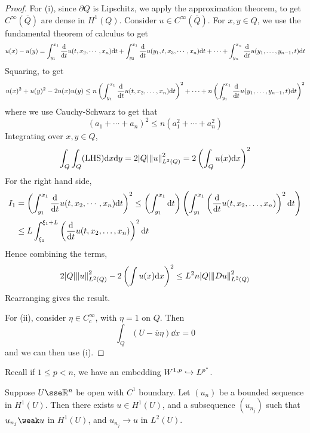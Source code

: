 \documentclass{article}
\begin{document}
\begin{proof}
    For (i), since \(\partial Q\) is Lipschitz, we apply the approximation theorem, to get \(C^\infty(\overline Q)\) are dense in \(H^1(Q)\). Consider \(u \in C^\infty(\overline Q)\). For \(x, y \in Q\), we use the fundamental theorem of calculus to get
    \begin{align*}
        u(x) - u(y) = \int_{y_1}^{x_1}\dv{t}u(t, x_2, \cdots, x_n)\dd t + \int_{y_2}^{x_1}\dv{t}u(y_1, t, x_3, \cdots, x_n)\dd t + \cdots + \int_{y_n}^{x_n}\dv{t}u(y_1, \dots, y_{n-1}, t)\dd t
    \end{align*}
    Squaring, to get
    \begin{align*}
        u(x)^2 + u(y)^2 - 2u(x)u(y) \le n\left(\int_{y_1}^{x_1}\dv{t}u(t, x_2, \dots, x_n)\dd t\right)^2 + \cdots + n\left(\int_{y_1}^{x_1}\dv{t}u(y_1, \dots, y_{n-1}, t)\dd t\right)^2
    \end{align*}
    where we use Cauchy-Schwarz to get that
    \[(a_1 + \cdots + a_n)^2 \le n(a_1^2 + \cdots + a_n^2)\]
    Integrating over \(x, y \in Q\),
    \[\int_Q\int_Q(\text{LHS})\dd x \dd y = 2 \abs{Q}\norm{u}^2_{L^2(Q)} = 2\left(\int_Qu(x)\dd x\right)^2\]
    For the right hand side,
    \begin{align*}
        I_1 &= \left(\int_{y_1}^{x_1}\dv{t}u(t, x_2, \cdots, x_n)\dd t\right)^2 \le \left(\int_{y_1}^{x_1}\dd t\right)\left(\int_{y_1}^{x_1}\left(\dv{t}u(t, x_2, \dots, x_n)\right)^2 \dd t\right) \\
        &\le L\int_{\xi_1}^{\xi_1 + L}\left(\dv{t}u(t, x_2, \dots, x_n)\right)^2 \dd t
    \end{align*}
    Hence combining the terms,
    \[2\abs{Q}\norm{u}^2_{L^2(Q)} - 2\left(\int u(x)\dd x\right)^2 \le L^2n\abs{Q}\norm{D u}^2_{L^2(Q)}\]
    Rearranging gives the result.

    For (ii), consider \(\eta \in C_c^\infty\), with \(\eta = 1\) on \(Q\). Then
    \[\int_Q (U - \overline u \eta) \dd x = 0\]
    and we can then use (i).
\end{proof}

Recall if \(1 \le p < n\), we have an embedding \(W^{1, p} \hookrightarrow L^{p^*}\).

\begin{theorem}
     Suppose \(U \sse \R^n\) be open with \(C^1\) boundary. Let \((u_n)\) be a bounded sequence in \(H^1(U)\). Then there exists \(u \in H^1(U)\), and a subsequence \((u_{n_j})\) such that \(u_{n_j} \weak u\) in \(H^1(U)\), and \(u_{n_j} \to u\) in \(L^2(U)\).
\end{theorem}
\end{document}
